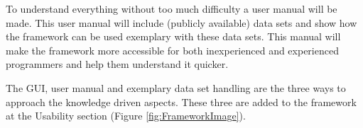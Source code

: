 \documentclass[10pt,a4paper]{article}
\begin{document}
	To understand everything without too much difficulty a user manual will be made. This user manual will include (publicly available) data sets and show how the framework can be used exemplary with these data sets. This manual will make the framework more accessible for both inexperienced and experienced programmers and help them understand it quicker.
	
	The GUI, user manual and exemplary data set handling are the three ways to approach the knowledge driven aspects. These three are added to the framework at the Usability section (Figure \ref{fig:FrameworkImage}).
	
	 
	
	
	\appendix
	
\end{document}
